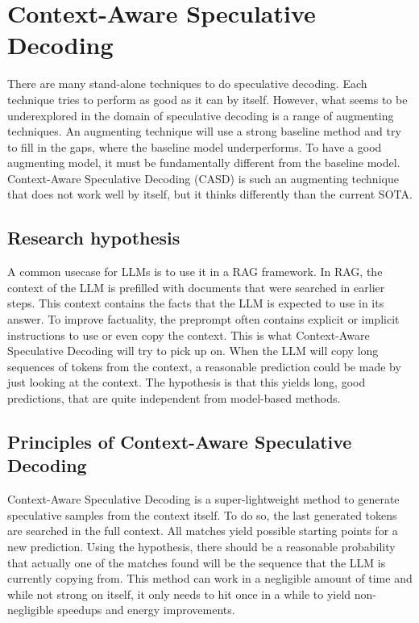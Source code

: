 
\chapter{Context-Aware Speculative Decoding}
\label{sec:casd}

There are many stand-alone techniques to do speculative decoding. Each technique tries to perform as good as it can by itself. However, what seems to be underexplored in the domain of speculative decoding is a range of augmenting techniques. An augmenting technique will use a strong baseline method and try to fill in the gaps, where the baseline model underperforms. To have a good augmenting model, it must be fundamentally different from the baseline model. Context-Aware Speculative Decoding (CASD) is such an augmenting technique that does not work well by itself, but it thinks differently than the current SOTA.

\section{Research hypothesis}
A common usecase for LLMs is to use it in a RAG framework. In RAG, the context of the LLM is prefilled with documents that were searched in earlier steps. This context contains the facts that the LLM is expected to use in its answer. To improve factuality, the preprompt often contains explicit or implicit instructions to use or even copy the context. This is what Context-Aware Speculative Decoding will try to pick up on. When the LLM will copy long sequences of tokens from the context, a reasonable prediction could be made by just looking at the context. The hypothesis is that this yields long, good predictions, that are quite independent from model-based methods.

\section{Principles of Context-Aware Speculative Decoding}
Context-Aware Speculative Decoding is a super-lightweight method to generate speculative samples from the context itself. To do so, the last generated tokens are searched in the full context. All matches yield possible starting points for a new prediction. Using the hypothesis, there should be a reasonable probability that actually one of the matches found will be the sequence that the LLM is currently copying from. This method can work in a negligible amount of time and while not strong on itself, it only needs to hit once in a while to yield non-negligible speedups and energy improvements.

